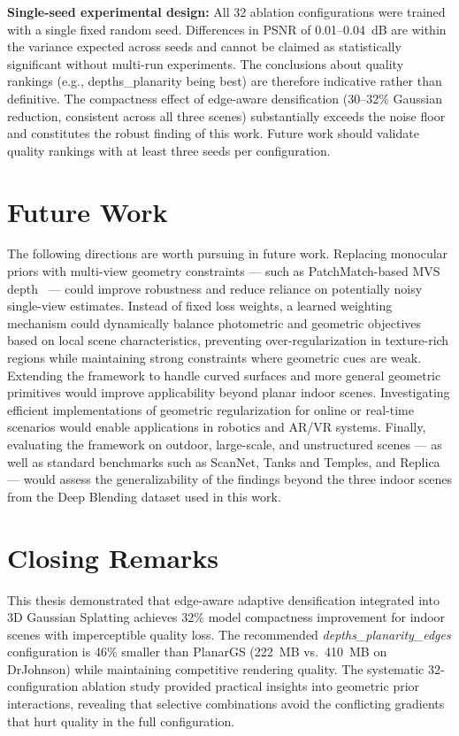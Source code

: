 \textbf{Single-seed experimental design:} All 32 ablation configurations were trained with a single fixed random seed. Differences in PSNR of 0.01--0.04~dB are within the variance expected across seeds and cannot be claimed as statistically significant without multi-run experiments. The conclusions about quality rankings (e.g., depths\_\allowbreak planarity being best) are therefore indicative rather than definitive. The compactness effect of edge-aware densification (30--32\% Gaussian reduction, consistent across all three scenes) substantially exceeds the noise floor and constitutes the robust finding of this work. Future work should validate quality rankings with at least three seeds per configuration.

\section{Future Work}

The following directions are worth pursuing in future work. Replacing monocular priors with multi-view geometry constraints — such as PatchMatch-based MVS depth~\cite{gcaussurf} — could improve robustness and reduce reliance on potentially noisy single-view estimates. Instead of fixed loss weights, a learned weighting mechanism could dynamically balance photometric and geometric objectives based on local scene characteristics, preventing over-regularization in texture-rich regions while maintaining strong constraints where geometric cues are weak. Extending the framework to handle curved surfaces and more general geometric primitives would improve applicability beyond planar indoor scenes. Investigating efficient implementations of geometric regularization for online or real-time scenarios would enable applications in robotics and AR/VR systems. Finally, evaluating the framework on outdoor, large-scale, and unstructured scenes — as well as standard benchmarks such as ScanNet, Tanks and Temples, and Replica — would assess the generalizability of the findings beyond the three indoor scenes from the Deep Blending dataset used in this work.

\section{Closing Remarks}

This thesis demonstrated that edge-aware adaptive densification integrated into 3D Gaussian Splatting achieves 32\% model compactness improvement for indoor scenes with imperceptible quality loss. The recommended \textit{depths\_\allowbreak planarity\_\allowbreak edges} configuration is 46\% smaller than PlanarGS (222~MB vs.\ 410~MB on DrJohnson) while maintaining competitive rendering quality. The systematic 32-configuration ablation study provided practical insights into geometric prior interactions, revealing that selective combinations avoid the conflicting gradients that hurt quality in the full configuration.

